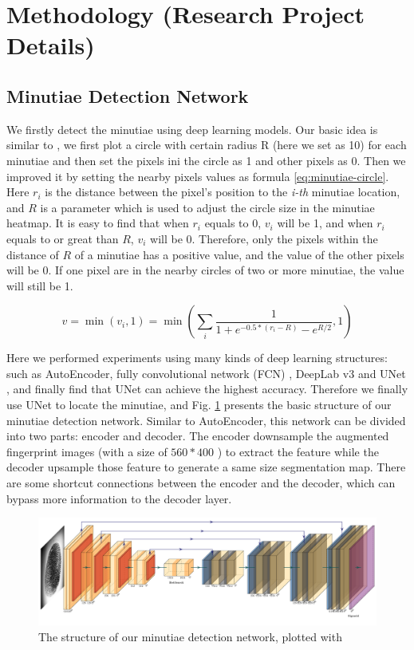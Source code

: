 \section{Methodology (Research Project Details)}


\subsection{Minutiae Detection Network}

We firstly detect the minutiae using deep learning models.
Our basic idea is similar to \cite{AccurateMultiPerson2017}, we first plot a circle with certain radius R (here we set as 10) for each minutiae and then set the pixels ini the circle as 1 and other pixels as 0.
Then we improved it by setting the nearby pixels values as formula \ref{eq:minutiae-circle}.
Here $ r_i $ is the distance between the pixel's position to the \textit{i-th} minutiae location, and $ R $ is a parameter which is used to adjust the circle size in the minutiae heatmap.
It is easy to find that when $ r_i $ equals to $ 0 $, $ v_i $ will be 1, and when $ r_i $ equals to or great than $ R $, $ v_i $ will be 0.
Therefore, only the pixels within the distance of $ R $ of a minutiae has a positive value, and the value of the other pixels will be 0.
If one pixel are in the nearby circles of two or more minutiae, the value will still be 1.


\begin{equation}
    \label{eq:minutiae-circle}
    v = \min(v_i, 1) = \min(\sum_{i}\frac{1}{1 + e^{-0.5*(r_i-R)} - e^{R/2}}, 1)
\end{equation}

Here we performed experiments using many kinds of deep learning structures: such as AutoEncoder, fully convolutional network (FCN) \cite{FCN}, DeepLab v3 \cite{DeepLab-v3} and UNet \cite{unet}, and finally find that UNet can achieve the highest accuracy.
Therefore we finally use UNet to locate the minutiae, and Fig. \ref{fig:unet} presents the basic structure of our minutiae detection network.
Similar to AutoEncoder, this network can be divided into two parts: encoder and decoder.
The encoder downsample the augmented fingerprint images (with a size of $ 560*400 $ ) to extract the feature while the decoder upsample those feature to generate a same size segmentation map.
There are some shortcut connections between the encoder and the decoder, which can bypass more information to the decoder layer.

\begin{figure}[htbp]
    \centering
    \includegraphics[width=.9\linewidth]{fig/unet.pdf}
    \caption{The structure of our minutiae detection network, plotted with \cite{PlotNeuralNet}}
    \label{fig:unet}
\end{figure}

